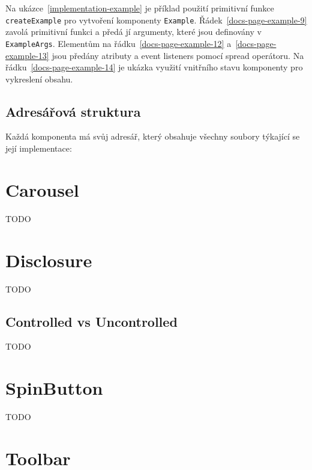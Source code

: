 Na ukázce~\ref{implementation-example} je příklad použití primitivní funkce \texttt{createExample} pro vytvoření komponenty \texttt{Example}.
Řádek~\ref{docs-page-example-9} zavolá primitivní funkci a předá jí argumenty, které jsou definovány v \texttt{ExampleArgs}.
Elementům na řádku~\ref{docs-page-example-12} a~\ref{docs-page-example-13} jsou předány atributy a event listeners pomocí spread operátoru.
Na řádku~\ref{docs-page-example-14} je ukázka využití vnitřního stavu komponenty pro vykreslení obsahu.

\subsection{Adresářová struktura}

Každá komponenta má svůj adresář, který obsahuje všechny soubory týkající se její implementace:

\vspace{11pt}


\section{Carousel}

TODO

\section{Disclosure}

TODO

\subsection{Controlled vs Uncontrolled}

TODO

\section{SpinButton}

TODO

\section{Toolbar}

